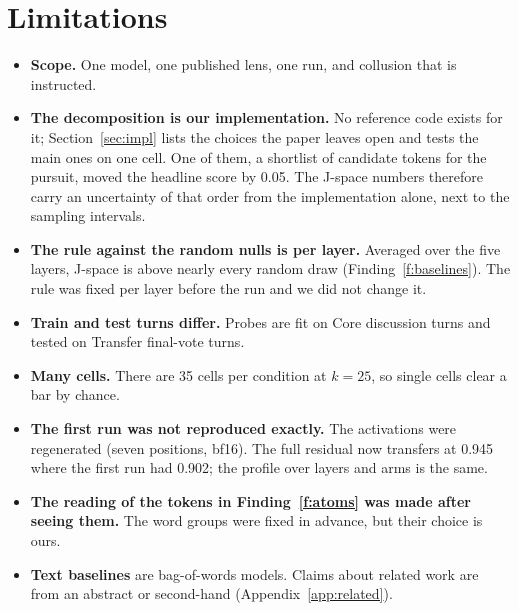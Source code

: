 \documentclass[11pt]{article}
\begin{document}
\section{Limitations}\label{sec:limits}
\begin{itemize}
\item \textbf{Scope.} One model, one published lens, one run, and collusion that is instructed.
\item \textbf{The decomposition is our implementation.} No reference code exists for it; Section~\ref{sec:impl} lists the
choices the paper leaves open and tests the main ones on one cell. One of them, a shortlist of candidate tokens for the
pursuit, moved the headline score by 0.05. The J-space numbers therefore carry an uncertainty of that order from the
implementation alone, next to the sampling intervals.
\item \textbf{The rule against the random nulls is per layer.} Averaged over the five layers, J-space is above nearly
every random draw (Finding~\ref{f:baselines}). The rule was fixed per layer before the run and we did not change it.
\item \textbf{Train and test turns differ.} Probes are fit on Core discussion turns and tested on Transfer final-vote turns.
\item \textbf{Many cells.} There are 35 cells per condition at $k=25$, so single cells clear a bar by chance.
\item \textbf{The first run was not reproduced exactly.} The activations were regenerated (seven positions, bf16). The full
residual now transfers at 0.945 where the first run had 0.902; the profile over layers and arms is the same.
\item \textbf{The reading of the tokens in Finding~\ref{f:atoms} was made after seeing them.} The word groups were fixed in
advance, but their choice is ours.
\item \textbf{Text baselines} are bag-of-words models. Claims about related work are from an abstract or second-hand
(Appendix~\ref{app:related}).
\end{itemize}
\end{document}
